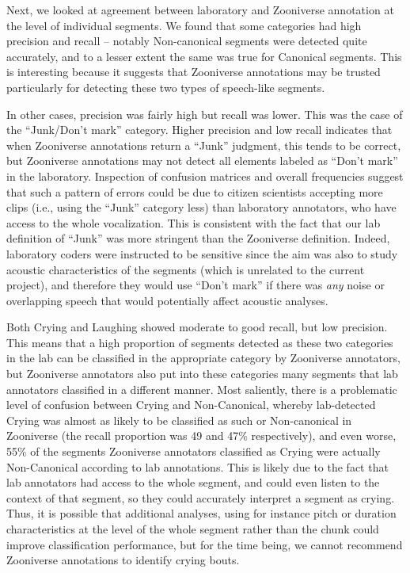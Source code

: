 \documentclass[english,,man]{apa6}
\begin{document}
Next, we looked at agreement between laboratory and Zooniverse annotation at the level of individual segments. We found that some categories had high precision and recall -- notably Non-canonical segments were detected quite accurately, and to a lesser extent the same was true for Canonical segments. This is interesting because it suggests that Zooniverse annotations may be trusted particularly for detecting these two types of speech-like segments.

In other cases, precision was fairly high but recall was lower. This was the case of the \enquote{Junk/Don't mark} category. Higher precision and low recall indicates that when Zooniverse annotations return a \enquote{Junk} judgment, this tends to be correct, but Zooniverse annotations may not detect all elements labeled as \enquote{Don't mark} in the laboratory. Inspection of confusion matrices and overall frequencies suggest that such a pattern of errors could be due to citizen scientists accepting more clips (i.e., using the \enquote{Junk} category less) than laboratory annotators, who have access to the whole vocalization. This is consistent with the fact that our lab definition of \enquote{Junk} was more stringent than the Zooniverse definition. Indeed, laboratory coders were instructed to be sensitive since the aim was also to study acoustic characteristics of the segments (which is unrelated to the current project), and therefore they would use \enquote{Don't mark} if there was \emph{any} noise or overlapping speech that would potentially affect acoustic analyses.

Both Crying and Laughing showed moderate to good recall, but low precision. This means that a high proportion of segments detected as these two categories in the lab can be classified in the appropriate category by Zooniverse annotators, but Zooniverse annotators also put into these categories many segments that lab annotators classified in a different manner. Most saliently, there is a problematic level of confusion between Crying and Non-Canonical, whereby lab-detected Crying was almost as likely to be classified as such or Non-canonical in Zooniverse (the recall proportion was 49 and 47\% respectively), and even worse, 55\% of the segments Zooniverse annotators classified as Crying were actually Non-Canonical according to lab annotations. This is likely due to the fact that lab annotators had access to the whole segment, and could even listen to the context of that segment, so they could accurately interpret a segment as crying. Thus, it is possible that additional analyses, using for instance pitch or duration characteristics at the level of the whole segment rather than the chunk could improve classification performance, but for the time being, we cannot recommend Zooniverse annotations to identify crying bouts.
\end{document}
